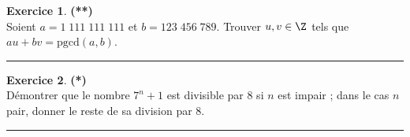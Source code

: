 \documentclass[a4paper,11pt]{article}
\theoremstyle{definition}
\newtheorem{exo}{Exercice} %
\begin{document}
\begin{minipage}{1\linewidth}
\begin{minipage}[t]{0.48\linewidth}
		\begin{exo}\textbf{(**)}\quad\\[0.2cm]
			Soient $a=1\;111\;111\;111$ et $b=123\;456\;789$. Trouver $u,v\in\Z$ tels que $au+bv= \text{pgcd}(a,b)$.

		
			\centering
			\rule{1\linewidth}{0.6pt}
		\end{exo}
		


	\begin{exo}\textbf{(*)}\quad\\[0.2cm]
		
		D\'emontrer que le nombre $7^n+1$ est divisible par
		$8$ si $n$ est impair ; dans le cas $n$ pair, donner le reste de
		sa division par $8$.
		
		
		\centering
		\rule{1\linewidth}{0.6pt}
	\end{exo}	
		
		
		
	\end{minipage}
\end{minipage}
\end{document}
